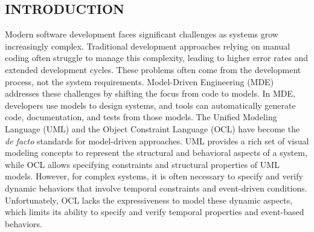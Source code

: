 \setcounter{page}{1}


\setlength{\parindent}{1cm}

\begin{center}
  \section*{INTRODUCTION}
\end{center}

Modern software development faces significant challenges as
systems grow increasingly complex. Traditional development approaches relying on 
manual coding often struggle to manage this complexity, leading to higher error
rates and extended development cycles. These problems often come from the development 
process, not the system requirements. Model-Driven Engineering (MDE) \cite{MDE} 
addresses these challenges by shifting the focus from code to models. 
In MDE, developers use models to design systems, and tools can automatically generate 
code, documentation, and tests from those models. 
The Unified Modeling Language (UML) \cite{UML} and the Object 
Constraint Language (OCL) \cite{OCL} have become the \textit{de facto} standards 
for model-driven approaches. UML provides a rich set of visual modeling concepts to 
represent the structural and behavioral aspects of a system, while OCL allows 
specifying constraints and structural properties of UML models. However, for 
complex systems, it is often necessary to specify and verify dynamic behaviors 
that involve temporal constraints and event-driven conditions. Unfortunately, OCL 
lacks the expressiveness to model these dynamic aspects, which limits its ability 
to specify and verify temporal properties and event-based behaviors.

